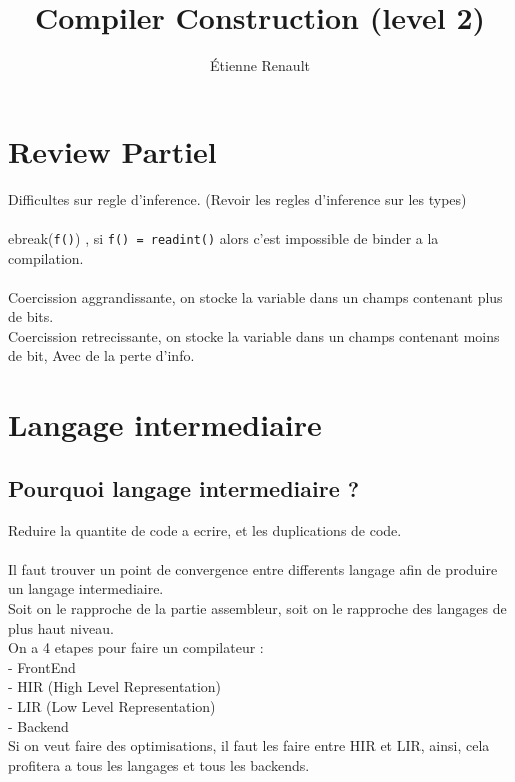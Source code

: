 \documentclass[a4paper,11pt]{article}
\title{Compiler Construction (level 2)}
\author{Étienne Renault}
\begin{document}
\maketitle
\tableofcontents
\newpage

\section*{Review Partiel}

Difficultes sur regle d'inference. (Revoir les regles d'inference sur les types)\\\\
ebreak(\texttt{f()}) , si \texttt{f() = readint()} alors c'est impossible de binder  a la compilation.\\\\
Coercission  aggrandissante, on stocke la variable dans un champs contenant plus de bits.\\
Coercission retrecissante, on stocke la variable dans un champs contenant moins de bit, Avec de la perte d'info.

\section{Langage intermediaire}

\subsection{Pourquoi langage intermediaire ?}
Reduire la quantite de code a ecrire, et les duplications de code.\\\\
Il faut trouver un point de convergence entre differents langage afin de produire  un langage intermediaire.\\
Soit on le rapproche de la partie assembleur, soit on le rapproche des langages de plus haut niveau.\\

On a 4 etapes pour faire un compilateur :\\
- FrontEnd\\
- HIR (High Level Representation)\\
- LIR (Low Level Representation)\\
- Backend\\

Si on veut faire des optimisations, il faut les faire entre HIR et LIR, ainsi, cela profitera a tous les langages et tous les backends.\\
\end{document}
